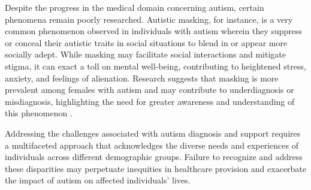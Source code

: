 Despite the progress in the medical domain concerning autism, certain phenomena remain poorly researched. Autistic masking, for instance, is a very common phenomenon observed in individuals with autism wherein they suppress or conceal their autistic traits in social situations to blend in or appear more socially adept. While masking may facilitate social interactions and mitigate stigma, it can exact a toll on mental well-being, contributing to heightened stress, anxiety, and feelings of alienation. Research suggests that masking is more prevalent among females with autism and may contribute to underdiagnosis or misdiagnosis, highlighting the need for greater awareness and understanding of this phenomenon \cite{2017PuttingMyBest}.

Addressing the challenges associated with autism diagnosis and support requires a multifaceted approach that acknowledges the diverse needs and experiences of individuals across different demographic groups. Failure to recognize and address these disparities may perpetuate inequities in healthcare provision and exacerbate the impact of autism on affected individuals' lives.

